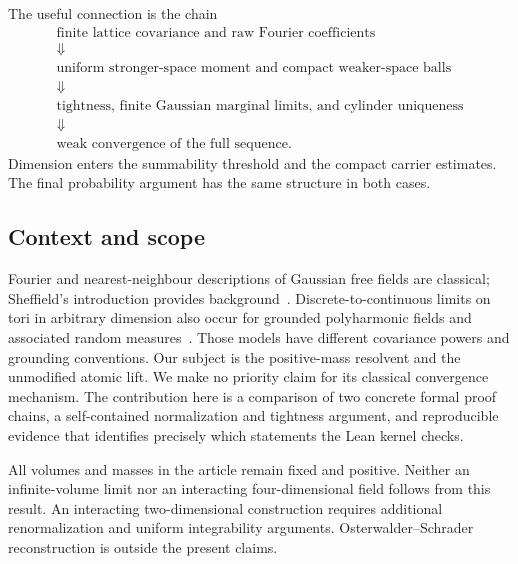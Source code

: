 The useful connection is the chain
\begin{equation}\label{eq:architecture}
\begin{gathered}
\text{finite lattice covariance and raw Fourier coefficients}\\
\Downarrow\\
\text{uniform stronger-space moment and compact weaker-space balls}\\
\Downarrow\\
\text{tightness, finite Gaussian marginal limits, and cylinder uniqueness}\\
\Downarrow\\
\text{weak convergence of the full sequence}.
\end{gathered}
\end{equation}
Dimension enters the summability threshold and the compact carrier estimates.
The final probability argument has the same structure in both cases.

\subsection{Context and scope}
Fourier and nearest-neighbour descriptions of Gaussian free fields are
classical; Sheffield's introduction provides background~\cite{Sheffield}.
Discrete-to-continuous limits on tori in arbitrary dimension also occur for
grounded polyharmonic fields and associated random measures~\cite{DSHKS}.
Those models have different covariance powers and grounding conventions.
Our subject is the positive-mass resolvent and the unmodified atomic lift.
We make no priority claim for its classical convergence mechanism.
The contribution here is a comparison of two concrete formal proof chains,
a self-contained normalization and tightness argument, and reproducible
evidence that identifies precisely which statements the Lean kernel checks.

All volumes and masses in the article remain fixed and positive. Neither an
infinite-volume limit nor an interacting four-dimensional field follows from
this result. An interacting two-dimensional construction requires additional
renormalization and uniform integrability arguments. Osterwalder--Schrader
reconstruction is outside the present claims.
